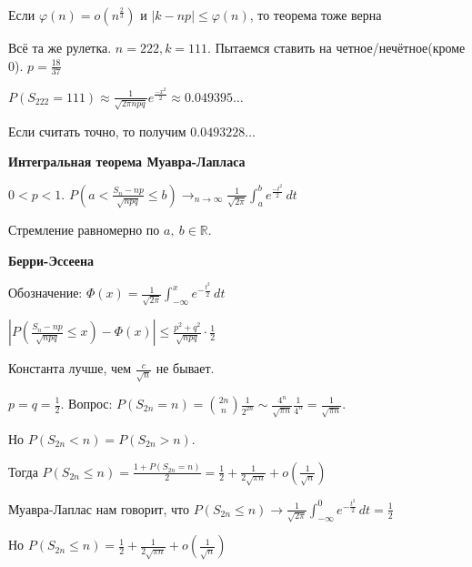 \begin{remark}
    Если $\varphi (n) = o(n^\frac{2}{3})$ и $|k - np| \leqslant \varphi (n)$, то теорема тоже верна
\end{remark}

\begin{example}
    Всё та же рулетка. $n = 222, k = 111$. Пытаемся ставить на четное/нечётное(кроме 0). $p = \frac{18}{37}$

    $P(S_{222} = 111) \approx \frac{1}{\sqrt{2 \pi n p q}} e^{\frac{-x^2}{2}} \approx 0.049395\ldots$

    Если считать точно, то получим $0.0493228\ldots$
\end{example}

\begin{theorem}
    \textbf{Интегральная теорема Муавра-Лапласа}

    $0 < p < 1$. $P(a < \frac{S_n - np}{\sqrt{npq}} \leqslant b) \rightarrow_{n \to \infty} \frac{1}{\sqrt{2\pi}} \int_a^b e^{\frac{-t^2}{2}} \, dt$

    Стремление равномерно по $a, \ b \in \mathbb{R}$.
\end{theorem}

\begin{theorem}
    \textbf{Берри-Эссеена}

    Обозначение: $\Phi (x) = \frac{1}{\sqrt{2\pi}} \int_{-\infty}^x e^{-\frac{t^2}{2}} \, dt$

    $\left| P(\frac{S_n - np}{\sqrt{npq}} \leqslant x) - \Phi (x) \right| \leqslant \frac{p^2 + q^2}{\sqrt{npq}} \cdot \frac{1}{2}$

    \begin{remark}
        Константа лучше, чем $\frac{c}{\sqrt{n}}$ не бывает. 
    \end{remark}
\end{theorem}

\begin{example}
    $p = q = \frac{1}{2}$. Вопрос: $P(S_{2n} = n) = \binom{2n}{n} \frac{1}{2^{2n}} \sim 
    \frac{4^n}{\sqrt{\pi n}} \frac{1}{4^n} = \frac{1}{\sqrt{\pi n}}$.

    Но $P(S_{2n} < n) = P(S_{2n} > n)$.
    
    Тогда $P(S_{2n} \leqslant n) = \frac{1 + P(S_{2n} = n)}{2} = \frac{1}{2} + \frac{1}{2\sqrt{\pi n}} + o(\frac{1}{\sqrt{n}})$

    Муавра-Лаплас нам говорит, что $P(S_{2n} \leqslant n) \to \frac{1}{\sqrt{2\pi}} \int_{-\infty}^0 e^{-\frac{t^2}{2}} \, dt = \frac{1}{2}$

    Но $P(S_{2n} \leqslant n) = \frac{1}{2} + \frac{1}{2\sqrt{\pi n}} + o(\frac{1}{\sqrt{n}})$
\end{example}

